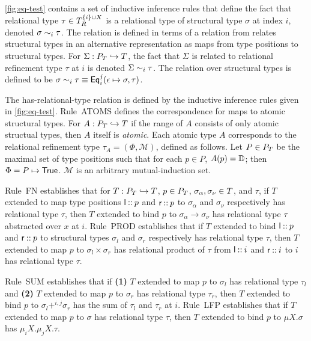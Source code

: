 \autoref{fig:eq-test} contains a set of inductive inference rules that
define the fact that relational type
$\tau \in T_{R}^{ \{ i \} \cup  X  }$ is a relational type of
structural type $\sigma$ at index $i$, denoted
$\sigma \sim_{i} \tau$.
%
The relation is defined in terms of a relation from relates structural
types in an alternative representation as maps from type positions to
structural types.
%
For $\Sigma: P_T \hookrightarrow T$, the fact that $\Sigma$ is related
to relational refinement type $\tau$ at $i$ is denoted
$\Sigma \sim_{i} \tau$.
%
The relation over structural types is defined to be
$\sigma \sim_{i} \tau \equiv \mathsf{Eq}_{i}^{j}(\epsilon \mapsto \sigma,
\tau)$.

The has-relational-type relation is defined by the inductive inference
rules given in \autoref{fig:eq-test}.
%
Rule~ATOMS defines the correspondence for maps to atomic structural
types.
For $A : P_T \hookrightarrow T$ if the range of $A$ consists of only
atomic structual types, then $A$ itself is \emph{atomic}.
Each atomic type $A$ corresponds to the relational refinement type
$\tau_A = (\Phi, \mathcal{M})$, defined as follows.
Let $P \in P_T$ be the maximal set of type positions such that for
each $p \in P$, $A(p) = \mathbb{D}$;
%
then $\Phi = P \mapsto \mathsf{True}$.
%
$\mathcal{M}$ is an arbitrary mutual-induction set.

Rule~FN establishes that for $T : P_T \hookrightarrow T$,
$p \in P_T$, $\sigma_{\alpha}, \sigma_{\nu} \in T$, and
$\tau$, if $T$ extended to map type positions $\mathsf{l} \mathbin{::} p$ and
$\mathsf{r} \mathbin{::} p$ to $\sigma_{\alpha}$ and $\sigma_{\nu}$
respectively has relational type $\tau$, then $T$ extended to bind $p$
to $\sigma_{\alpha} \to \sigma_{\nu}$ has relational type $\tau$
abstracted over $x$ at $i$.
Rule~PROD establishes that if $T$ extended to bind
$\mathsf{l} \mathbin{::} p$ and $\mathsf{r} \mathbin{::} p$ to structural types
$\sigma_l$ and $\sigma_r$ respectively has relational type $\tau$,
then $T$ extended to map $p$ to $\sigma_l \times \sigma_r$ has
relational product of $\tau$ from $\mathsf{l} \mathbin{::} i$ and
$\mathsf{r} \mathbin{::} i$ to $i$ has relational type $\tau$.

Rule~SUM establishes that if %
\textbf{(1)} $T$ extended to map $p$ to $\sigma_l$ has relational type
$\tau_l$ and %
\textbf{(2)} $T$ extended to map $p$ to $\sigma_r$ has relational type
$\tau_r$, then %
$T$ extended to bind $p$ to $\sigma_l +^{i, j} \sigma_r$ has the sum
of $\tau_l$ and $\tau_r$ at $i$.
%
Rule~LFP establishes that if %
$T$ extended to map $p$ to $\sigma$ has relational type $\tau$, then
$T$ extended to bind $p$ to $\mu X. \sigma$ has
$\mu_i X. \mu_j X. \tau$.

